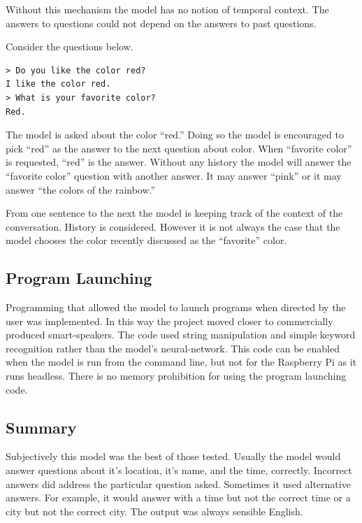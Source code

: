 Without this mechanism the model has no notion of temporal context. The answers to questions could not depend on the answers to past questions. %

Consider the questions below.
\begin{verbatim}
> Do you like the color red?
I like the color red.
> What is your favorite color?
Red.
\end{verbatim}

\label{install-gpt2-history}

The model is asked about the color ``red.'' Doing so the model is encouraged to pick ``red'' as the answer to the next question about color. When ``favorite color'' is requested, ``red'' is the answer. Without any history the model will answer the ``favorite color'' question with another answer. It may answer ``pink'' or it may answer ``the colors of the rainbow.'' 

From one sentence to the next the model is keeping track of the context of the conversation. History is considered. However it is not always the case that the model chooses the color recently discussed as the ``favorite'' color.


\subsection{Program Launching}

Programming that allowed the model to launch programs when directed by the user was implemented. In this way the project moved closer to commercially produced smart-speakers. The code used string manipulation and simple keyword recognition rather than the model's neural-network. This code can be enabled when the model is run from the command line, but not for the Raspberry Pi as it runs headless. There is no memory prohibition for using the program launching code. %

\subsection{Summary}

Subjectively this model was the best of those tested. Usually the model would answer questions about it's location, it's name, and the time, correctly. %
Incorrect answers did address the particular question asked. Sometimes it used alternative answers. For example, it would answer with a time but not the correct time or a city but not the correct city.  The output was always sensible English. 
 
